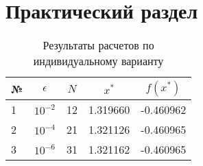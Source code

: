\chapter{Практический раздел}


\begin{table}[h!]
    \caption{Результаты расчетов по индивидуальному варианту}
    \label{tab:results}
    \begin{tabular}{|l|l|r|r|r|}
    \hline
    \multicolumn{1}{|c|}{№} & \multicolumn{1}{c|}{\textbf{$\epsilon$}} & \multicolumn{1}{c|}{$N$} & \multicolumn{1}{c|}{\textbf{$x^{*}$}} & \multicolumn{1}{c|}{\textbf{$f(x^{*})$}} \\ \hline
    1                                & $10^{-2}$                                             & 12                              & 1.319660                              & -0.460962                               \\ \hline
    2                                & $10^{-4}$                                             & 21                              & 1.321126                              & -0.460965                                \\ \hline
    3                                & $10^{-6}$                                             & 31                              & 1.321162                              & -0.460965                                \\ \hline
    \end{tabular}
    \end{table}